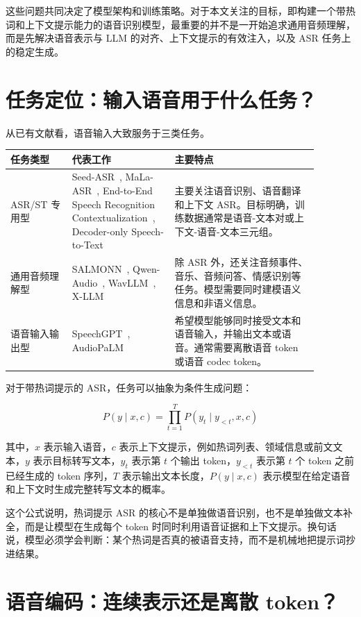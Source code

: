 \documentclass[UTF8,fontset=fandol]{ctexart}
\begin{document}
这些问题共同决定了模型架构和训练策略。对于本文关注的目标，即构建一个带热词和上下文提示能力的语音识别模型，最重要的并不是一开始追求通用音频理解，而是先解决语音表示与 LLM 的对齐、上下文提示的有效注入，以及 ASR 任务上的稳定生成。

\section{任务定位：输入语音用于什么任务？}

从已有文献看，语音输入大致服务于三类任务。

\begin{longtable}{p{0.18\linewidth}p{0.28\linewidth}p{0.42\linewidth}}
\toprule
任务类型 & 代表工作 & 主要特点 \\
\midrule
ASR/ST 专用型 & Seed-ASR~\cite{bai2024seed}, MaLa-ASR~\cite{yang2024mala}, End-to-End Speech Recognition Contextualization~\cite{lakomkin2024contextual}, Decoder-only Speech-to-Text~\cite{wu2023decoder} & 主要关注语音识别、语音翻译和上下文 ASR。目标明确，训练数据通常是语音-文本对或上下文-语音-文本三元组。 \\
\midrule
通用音频理解型 & SALMONN~\cite{tang2023salmonn}, Qwen-Audio~\cite{chu2023qwen}, WavLLM~\cite{hu2024wavllm}, X-LLM~\cite{chen2023xllm} & 除 ASR 外，还关注音频事件、音乐、音频问答、情感识别等任务。模型需要同时建模语义信息和非语义信息。 \\
\midrule
语音输入输出型 & SpeechGPT~\cite{zhang2023speechgpt}, AudioPaLM~\cite{rubenstein2023audiopalm} & 希望模型能够同时接受文本和语音输入，并输出文本或语音。通常需要离散语音 token 或语音 codec token。 \\
\bottomrule
\end{longtable}

对于带热词提示的 ASR，任务可以抽象为条件生成问题：

$$
P(y \mid x, c)=\prod_{t=1}^{T}P(y_t \mid y_{<t}, x, c)
$$

其中，$x$ 表示输入语音，$c$ 表示上下文提示，例如热词列表、领域信息或前文文本，$y$ 表示目标转写文本，$y_t$ 表示第 $t$ 个输出 token，$y_{<t}$ 表示第 $t$ 个 token 之前已经生成的 token 序列，$T$ 表示输出文本长度，$P(y \mid x,c)$ 表示模型在给定语音和上下文时生成完整转写文本的概率。

这个公式说明，热词提示 ASR 的核心不是单独做语音识别，也不是单独做文本补全，而是让模型在生成每个 token 时同时利用语音证据和上下文提示。换句话说，模型必须学会判断：某个热词是否真的被语音支持，而不是机械地把提示词抄进结果。

\section{语音编码：连续表示还是离散 token？}
\end{document}
